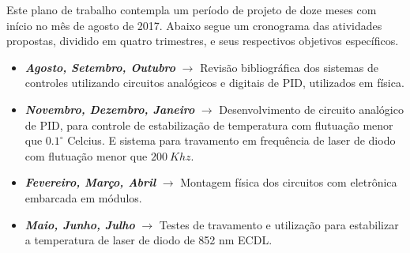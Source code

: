 Este plano de trabalho contempla um período de projeto de doze meses com início no mês de agosto de 2017. Abaixo segue um cronograma das atividades propostas, dividido em quatro trimestres, e seus respectivos objetivos específicos.

\begin{itemize}

\item \textbf{\textit{Agosto, Setembro, Outubro}} $\rightarrow$ Revisão bibliográfica dos sistemas de controles utilizando circuitos analógicos e digitais de PID, utilizados em física. 

\item \textbf{\textit{Novembro, Dezembro, Janeiro}} $\rightarrow$ Desenvolvimento de circuito analógico de PID, para controle de estabilização de temperatura com flutuação menor que $0.1^{\circ}$ Celcius. E sistema para travamento em frequência de laser de diodo com flutuação menor que $200~Khz$.

\item \textbf{\textit{Fevereiro, Março, Abril}} $\rightarrow$ Montagem física dos circuitos com eletrônica embarcada em módulos.

\item \textbf{\textit{Maio, Junho, Julho}} $\rightarrow$ Testes de travamento e utilização para estabilizar a temperatura de laser de diodo de 852 nm ECDL.
 
\end{itemize}
